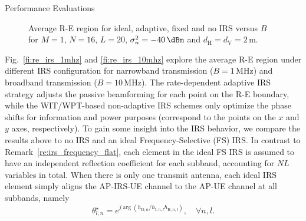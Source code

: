 \documentclass[journal]{IEEEtran}
\begin{document}
\begin{section}{Performance Evaluations}
		\begin{figure}[!t]
			\centering
			\subfloat[$B=1\,\si{\MHz}$\label{fi:re_irs_1mhz}]{
				\resizebox{0.45\columnwidth}{!}{
					
				}
			}
			\subfloat[$B=10\,\si{\MHz}$\label{fi:re_irs_10mhz}]{
				\resizebox{0.45\columnwidth}{!}{
					
				}
			}
			\caption{Average R-E region for ideal, adaptive, fixed and no IRS versus $B$ for $M=1$, $N=16$, $L=20$, $\sigma_n^2=-40\,\si{\dBm}$ and $d_{\mathrm{H}}=d_{\mathrm{V}}=2\,\si{\meter}$.}
		\end{figure}

		Fig.~\ref{fi:re_irs_1mhz} and \ref{fi:re_irs_10mhz} explore the average R-E region under different IRS configuration for narrowband transmission ($B=1\,\si{\MHz}$) and broadband transmission ($B=10\,\si{\MHz}$). The rate-dependent adaptive IRS strategy adjusts the passive beamforming for each point on the R-E boundary, while the WIT/WPT-based non-adaptive IRS schemes only optimize the phase shifts for information and power purposes (correspond to the points on the $x$ and $y$ axes, respectively). To gain some insight into the IRS behavior, we compare the results above to no IRS and an ideal Frequency-Selective (FS) IRS. In contrast to Remark~\ref{re:irs_frequency_flat}, each element in the ideal FS IRS is assumed to have an independent reflection coefficient for each subband, accounting for $NL$ variables in total. When there is only one transmit antenna, each ideal IRS element simply aligns the AP-IRS-UE channel to the AP-UE channel at all subbands, namely
		\begin{equation}
			\theta_{l,n}^{\star}=e^{j\arg{\left(h_{\mathrm{D},n}/h_{\mathrm{I},n,l}h_{\mathrm{R},n,l}\right)}},\quad \forall n,l.
		\end{equation}

\end{section}
\end{document}
